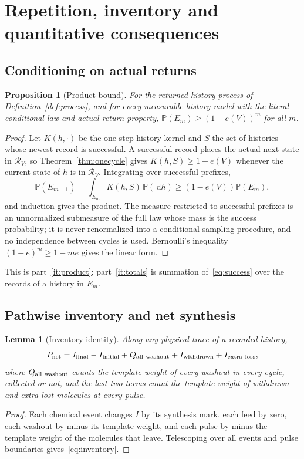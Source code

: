 \documentclass[11pt,a4paper]{article}
\theoremstyle{plain}
\newtheorem{proposition}[theorem]{Proposition}
\newtheorem{lemma}[theorem]{Lemma}
\theoremstyle{definition}
\theoremstyle{remark}
\newcommand{\Prob}{\mathbb P}
\newcommand{\dd}{\,\mathrm d}
\newcommand{\cR}{\mathcal R}
\newcommand{\Iv}{I}
\newcommand{\Pnet}{P_{\mathrm{net}}}
\begin{document}
\section{Repetition, inventory and quantitative consequences}\label{sec:repeat}

\subsection{Conditioning on actual returns}
\begin{proposition}[Product bound]\label{prop:product}
For the returned-history process of Definition~\ref{def:process}, and for every measurable history model with the literal conditional law and actual-return property, $\Prob(E_m)\ge(1-e(V))^m$ for all $m$.
\end{proposition}
\begin{proof}
Let $K(h,\cdot)$ be the one-step history kernel and $S$ the set of histories whose newest record is successful. A successful record places the actual next state in $\cR_V$, so Theorem~\ref{thm:onecycle} gives $K(h,S)\ge1-e(V)$ whenever the current state of $h$ is in $\cR_V$. Integrating over successful prefixes,
\[
\Prob(E_{m+1})=\int_{E_m}K(h,S)\,\Prob(\dd h)\ge(1-e(V))\Prob(E_m),
\]
and induction gives the product. The measure restricted to successful prefixes is an unnormalized submeasure of the full law whose mass is the success probability; it is never renormalized into a conditional sampling procedure, and no independence between cycles is used. Bernoulli's inequality $(1-e)^m\ge1-me$ gives the linear form.
\end{proof}
This is part~\ref{it:product}; part~\ref{it:totals} is summation of~\eqref{eq:success} over the records of a history in $E_m$.

\subsection{Pathwise inventory and net synthesis}
\begin{lemma}[Inventory identity]\label{lem:inventory}
Along any physical trace of a recorded history,
\begin{equation}\label{eq:inventory}
\Pnet=\Iv_{\rm final}-\Iv_{\rm initial}+Q_{\rm all\ washout}+\Iv_{\rm withdrawn}+\Iv_{\rm extra\ loss},
\end{equation}
where $Q_{\rm all\ washout}$ counts the template weight of every washout in every cycle, collected or not, and the last two terms count the template weight of withdrawn and extra-lost molecules at every pulse.
\end{lemma}
\begin{proof}
Each chemical event changes $\Iv$ by its synthesis mark, each feed by zero, each washout by minus its template weight, and each pulse by minus the template weight of the molecules that leave. Telescoping over all events and pulse boundaries gives~\eqref{eq:inventory}.
\end{proof}
\end{document}
